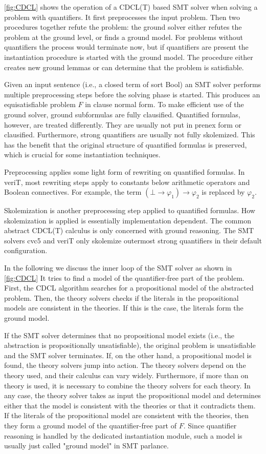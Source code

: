 \cref{fig:CDCL} shows the operation of a CDCL(T) based SMT solver when
solving a problem with quantifiers. It first preprocesses the input problem.
Then two procedures together refute the problem: the ground solver either
refutes the problem at the ground level, or finds a ground model. For problems without quantifiers the process would terminate now, but if quantifiers
are present the instantiation procedure is started with the ground model.
The procedure either creates new ground lemmas or can determine that the
problem is satisfiable.


Given an input sentence (i.e., a closed term of sort Bool) an SMT solver
performs multiple preprocessing steps before the solving phase is started.
This produces an equisatisfiable problem $F$ in clause normal form.
To make efficient use of the ground solver, ground subformulas are fully
clausified. Quantified formulas, however, are treated differently. They are
usually not put in prenex form or clausified. Furthermore, strong quantifiers are usually not fully skolemized. This has the benefit that the original
structure of quantified formulas is preserved, which is crucial for some instantiation techniques.

Preprocessing applies some light form of rewriting on quantified formulas. In veriT, most rewriting steps apply to constants below arithmetic
operators and Boolean connectives. For example, the term $(\bot \to \varphi_1) \to \varphi_2$ is replaced by $\varphi_2$.

Skolemization is another preprocessing step applied to quantified formulas.
How skolemization is applied is essentially implementation dependent.
The common abstract CDCL(T) calculus is only concerned with ground reasoning.
The SMT solvers cvc5 and veriT only skolemize outermost strong quantifiers in their default configuration.

In the following we discuss the inner loop of the SMT solver as shown in
\cref{fig:CDCL} It tries to find a model of the quantifier-free part of the problem.
First, the CDCL algorithm searches for a propositional model of the abstracted problem.
Then, the theory solvers checks if the literals in the propositional models are consistent in the theories.
If this is the case, the literals form the ground model.

If the SMT solver determines that no propositional model exists (i.e., the
abstraction is propositionally unsatisfiable), the original problem is unsatisfiable and the SMT solver terminates. If, on the other hand, a propositional
model is found, the theory solvers jump into action. The theory solvers depend on the theory used, and their calculus can vary widely. Furthermore, if
more than on theory is used, it is necessary to combine the theory solvers for each theory.
In any case, the theory solver takes as input the propositional model and determines either that the model is consistent with the theories or that it contradicts them.
If the literals of the propositional model are consistent with the theories, then they form a ground model of the quantifier-free part of $F$.
Since quantifier reasoning is handled by the dedicated instantiation module, such a model is usually just called "ground model" in SMT parlance.